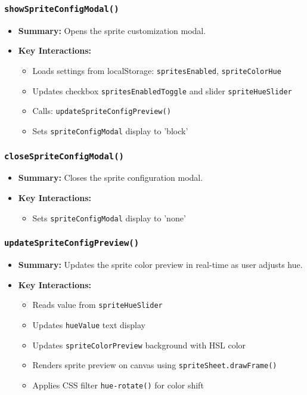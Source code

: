 \documentclass[11pt,letterpaper]{article}
\begin{document}
\subsubsection{\texttt{showSpriteConfigModal()}}
\begin{itemize}
    \item \textbf{Summary:} Opens the sprite customization modal.
    \item \textbf{Key Interactions:}
    \begin{itemize}
        \item Loads settings from localStorage: \texttt{spritesEnabled}, \texttt{spriteColorHue}
        \item Updates checkbox \texttt{spritesEnabledToggle} and slider \texttt{spriteHueSlider}
        \item Calls: \texttt{updateSpriteConfigPreview()}
        \item Sets \texttt{spriteConfigModal} display to 'block'
    \end{itemize}
\end{itemize}

\subsubsection{\texttt{closeSpriteConfigModal()}}
\begin{itemize}
    \item \textbf{Summary:} Closes the sprite configuration modal.
    \item \textbf{Key Interactions:}
    \begin{itemize}
        \item Sets \texttt{spriteConfigModal} display to 'none'
    \end{itemize}
\end{itemize}

\subsubsection{\texttt{updateSpriteConfigPreview()}}
\begin{itemize}
    \item \textbf{Summary:} Updates the sprite color preview in real-time as user adjusts hue.
    \item \textbf{Key Interactions:}
    \begin{itemize}
        \item Reads value from \texttt{spriteHueSlider}
        \item Updates \texttt{hueValue} text display
        \item Updates \texttt{spriteColorPreview} background with HSL color
        \item Renders sprite preview on canvas using \texttt{spriteSheet.drawFrame()}
        \item Applies CSS filter \texttt{hue-rotate()} for color shift
    \end{itemize}
\end{itemize}
\end{document}
